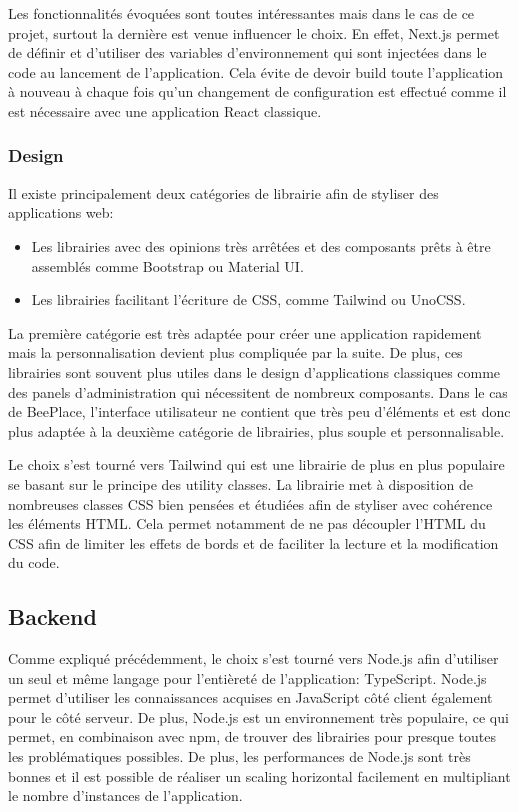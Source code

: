Les fonctionnalités évoquées sont toutes intéressantes mais dans le cas de ce projet, surtout la dernière est venue influencer le choix. En effet, Next.js permet de définir et d'utiliser des variables d'environnement qui sont injectées dans le code au lancement de l'application. Cela évite de devoir build toute l'application à nouveau à chaque fois qu'un changement de configuration est effectué comme il est nécessaire avec une application React classique.

\subsubsection{Design}

Il existe principalement deux catégories de librairie afin de styliser des applications web:

\begin{itemize}
  \item Les librairies avec des opinions très arrêtées et des composants prêts à être assemblés comme Bootstrap ou Material UI.
  \item Les librairies facilitant l'écriture de CSS, comme Tailwind ou UnoCSS.
\end{itemize}

La première catégorie est très adaptée pour créer une application rapidement mais la personnalisation devient plus compliquée par la suite. De plus, ces librairies sont souvent plus utiles dans le design d'applications classiques comme des panels d'administration qui nécessitent de nombreux composants. Dans le cas de BeePlace, l'interface utilisateur ne contient que très peu d'éléments et est donc plus adaptée à la deuxième catégorie de librairies, plus souple et personnalisable.

Le choix s'est tourné vers Tailwind \cite{tailwindcss} qui est une librairie de plus en plus populaire se basant sur le principe des utility classes. La librairie met à disposition de nombreuses classes CSS bien pensées et étudiées afin de styliser avec cohérence les éléments HTML. Cela permet notamment de ne pas découpler l'HTML du CSS afin de limiter les effets de bords et de faciliter la lecture et la modification du code.

\subsection{Backend}

Comme expliqué précédemment, le choix s'est tourné vers Node.js \cite{nodejs} afin d'utiliser un seul et même langage pour l'entièreté de l'application: TypeScript. Node.js permet d'utiliser les connaissances acquises en JavaScript côté client également pour le côté serveur. De plus, Node.js est un environnement très populaire, ce qui permet, en combinaison avec \Gls{npm}, de trouver des librairies pour presque toutes les problématiques possibles. De plus, les performances de Node.js sont très bonnes et il est possible de réaliser un scaling horizontal facilement en multipliant le nombre d'instances de l'application.

